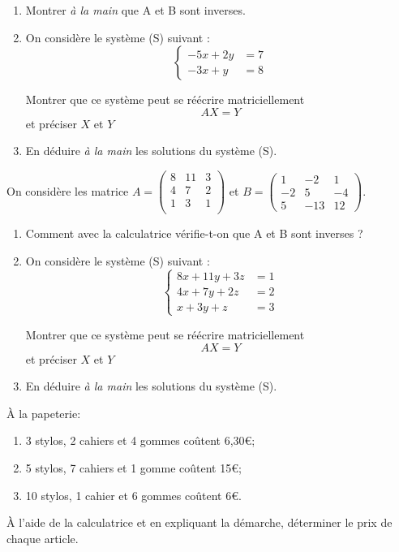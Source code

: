 \documentclass[a4paper,10pt]{article}
\begin{document}
\begin{enumerate}[\bfseries 1.]
	\item 	Montrer \textit{à la main} que A et B sont inverses.
	\item 	On considère le système (S) suivant :
			$$\begin{cases}
				-5x+2y	&=7	\\
				-3x+y	&=8
			\end{cases}$$
			
			Montrer que ce système peut se réécrire matriciellement $$AX=Y$$ et préciser $X$ et $Y$
	\item 	En déduire \textit{à la main} les solutions du système (S).\\
\end{enumerate}



On considère les matrice $A=\begin{pmatrix}
8&11&3\\
4&7&2\\
1&3&1\\
\end{pmatrix}$ et $B=\begin{pmatrix}
1&-2&1\\
-2&5&-4\\
5&-13&12
\end{pmatrix}$.

\begin{enumerate}[\bfseries 1.]
	\item 	Comment avec la calculatrice vérifie-t-on que A et B sont inverses ?
	\item 	On considère le système (S) suivant :
			$$\begin{cases}
				8x+11y+3z	&=1	\\
				4x+7y+2z	&=2 \\
				x+3y+z&=3
			\end{cases}$$
			
			Montrer que ce système peut se réécrire matriciellement $$AX=Y$$ et préciser $X$ et $Y$
	\item 	En déduire \textit{à la main} les solutions du système (S).\\
\end{enumerate}

\exo{}

À la papeterie:
\begin{enumerate}[--]
	\item 	3 stylos, 2 cahiers et 4 gommes coûtent 6,30€;
	\item 	5 stylos, 7 cahiers et 1 gomme coûtent 15€;
	\item 	10 stylos, 1 cahier et 6 gommes coûtent 6€.
\end{enumerate}
À l'aide de la calculatrice et en expliquant la démarche, déterminer le prix de chaque article.
\end{document}

